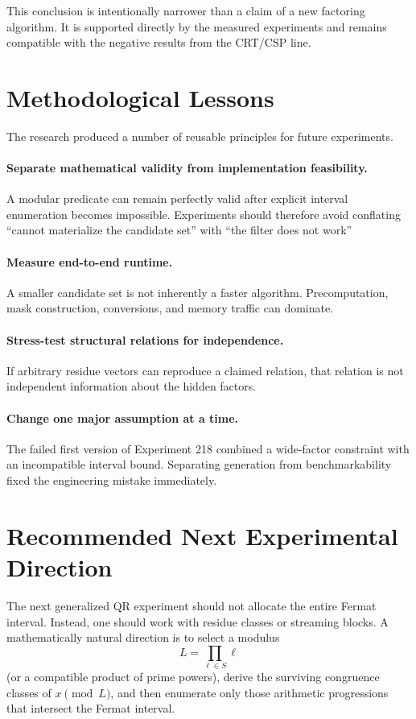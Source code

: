 \documentclass[11pt,a4paper]{article}
\begin{document}
This conclusion is intentionally narrower than a claim of a new factoring algorithm. It is supported directly by the measured experiments and remains compatible with the negative results from the CRT/CSP line.

\section{Methodological Lessons}

The research produced a number of reusable principles for future experiments.

\paragraph{Separate mathematical validity from implementation feasibility.}
A modular predicate can remain perfectly valid after explicit interval enumeration becomes impossible. Experiments should therefore avoid conflating ``cannot materialize the candidate set'' with ``the filter does not work''

\paragraph{Measure end-to-end runtime.}
A smaller candidate set is not inherently a faster algorithm. Precomputation, mask construction, conversions, and memory traffic can dominate.

\paragraph{Stress-test structural relations for independence.}
If arbitrary residue vectors can reproduce a claimed relation, that relation is not independent information about the hidden factors.

\paragraph{Change one major assumption at a time.}
The failed first version of Experiment 218 combined a wide-factor constraint with an incompatible interval bound. Separating generation from benchmarkability fixed the engineering mistake immediately.

\section{Recommended Next Experimental Direction}

The next generalized QR experiment should not allocate the entire Fermat interval. Instead, one should work with residue classes or streaming blocks. A mathematically natural direction is to select a modulus
\[
 L=\prod_{\ell\in S}\ell
\]
(or a compatible product of prime powers), derive the surviving congruence classes of $x\pmod L$, and then enumerate only those arithmetic progressions that intersect the Fermat interval.
\end{document}
